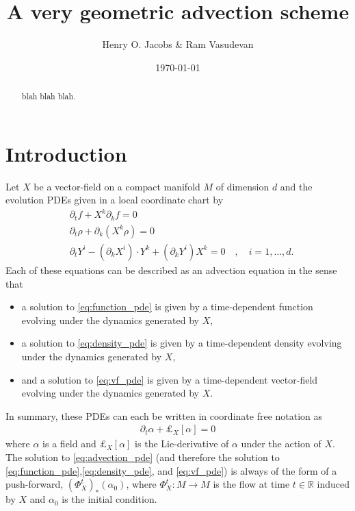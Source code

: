 \documentclass[12pt]{amsart}
\title{A very geometric advection scheme}
\author{Henry O. Jacobs \& Ram Vasudevan}
\date{\today}
\newcommand{\R}{\ensuremath{\mathbb{R}}}
\begin{document}
\maketitle

\begin{abstract}
  blah blah blah.
\end{abstract}

\section{Introduction}
\label{sec:PDEs}
Let $X$ be a vector-field on a compact manifold $M$ of dimension $d$
and the evolution PDEs given in a local coordinate chart by
\begin{align}
	&\partial_t f + X^k \partial_k f= 0 \label{eq:function_pde} \\
	&\partial_t \rho + \partial_k( X^k \rho) = 0  \label{eq:density_pde} \\
	&\partial_t Y^i - (\partial_k X^i) \cdot Y^k + (\partial_k Y^i) X^k  = 0 \quad , \quad i = 1,\dots,d \label{eq:vf_pde}.
\end{align}
Each of these equations can be described as an advection equation in the sense that
\begin{itemize}
	\item a solution to \eqref{eq:function_pde} is given by a time-dependent function evolving under the dynamics generated by $X$,
	\item a solution to \eqref{eq:density_pde} is given by a time-dependent density evolving under the dynamics generated by $X$,
	\item and a solution to \eqref{eq:vf_pde} is given by a time-dependent vector-field evolving under the dynamics generated by $X$.
\end{itemize}
In summary, these PDEs can each be written in coordinate free notation as
\begin{align}
	\partial_t \alpha + \pounds_{X}[\alpha] = 0 \label{eq:advection_pde}
\end{align}
where $\alpha$ is a field and $\pounds_X[\alpha]$ is the Lie-derivative of $\alpha$ under the action of $X$.
The solution to \eqref{eq:advection_pde} (and therefore the solution to \eqref{eq:function_pde},\eqref{eq:density_pde}, and \eqref{eq:vf_pde}) is always of the form of a push-forward, $(\Phi_{X}^t)_* (\alpha_0)$, where $\Phi_{X}^t : M \to M$ is the flow at time $t \in \R$ induced by $X$ and $\alpha_0$ is the initial condition.
\end{document}
